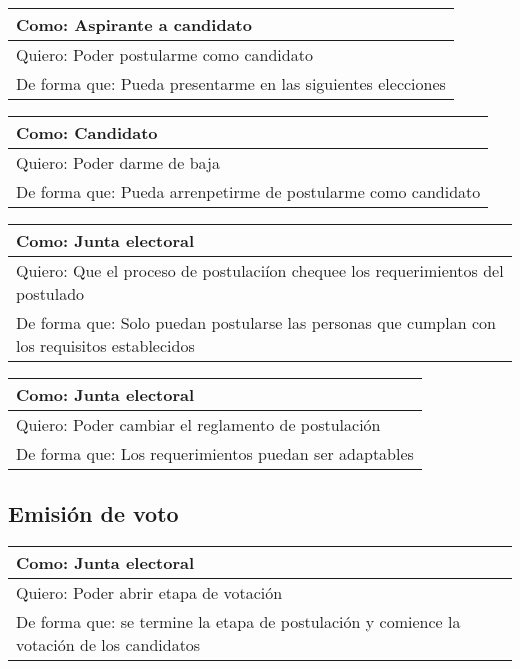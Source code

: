 \bigskip

\begin{tabular}{|l|}
\hline
Como: Aspirante a candidato\\
\hline
Quiero: Poder postularme como candidato\\
\hline
De forma que: Pueda presentarme en las siguientes elecciones \\
\hline
\end{tabular}


\bigskip

\begin{tabular}{|l|}
\hline
Como: Candidato\\
\hline
Quiero: Poder darme de baja\\
\hline
De forma que: Pueda arrenpetirme de postularme como candidato \\
\hline
\end{tabular}


\bigskip

\begin{tabular}{|l|}
\hline
Como: Junta electoral\\
\hline
Quiero: Que el proceso de postulaci\'ion chequee los requerimientos del postulado\\
\hline
De forma que: Solo puedan postularse las personas que cumplan con los requisitos establecidos \\
\hline
\end{tabular}


\bigskip

\begin{tabular}{|l|}
\hline
Como: Junta electoral\\
\hline
Quiero: Poder cambiar el reglamento de postulaci\'on\\
\hline
De forma que: Los requerimientos puedan ser adaptables \\
\hline
\end{tabular}


\bigskip

\subsection{Emisi\'on de voto}


\begin{tabular}{|l|}
\hline
Como: Junta electoral\\
\hline
Quiero: Poder abrir etapa de votaci\'on\\
\hline
De forma que: se termine la etapa de postulaci\'on y comience la votaci\'on de los candidatos\\
\hline
\end{tabular}

